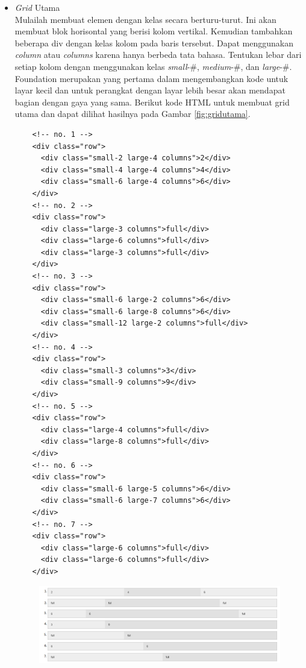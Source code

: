\begin{enumerate}[(1)]
\begin{itemize}
  \item {\it Grid} Utama\\
  Mulailah membuat elemen dengan kelas secara berturu-turut. Ini akan membuat
  blok horisontal yang berisi kolom vertikal. Kemudian tambahkan beberapa div
  dengan kelas kolom pada baris tersebut. Dapat menggunakan {\it column} atau
  {\it columns} karena hanya berbeda tata bahasa. Tentukan lebar dari setiap
  kolom dengan menggunakan kelas {\it small}-\#, {\it medium}-\#, dan
  {\it large}-\#.
  Foundation merupakan yang pertama dalam mengembangkan kode untuk layar kecil
  dan untuk perangkat dengan layar lebih besar akan mendapat bagian dengan gaya yang
  sama. Berikut kode HTML untuk membuat grid utama dan dapat dilihat hasilnya
  pada Gambar \ref{fig:gridutama}.
  	\begin{lstlisting}
  	<!-- no. 1 -->
  	<div class="row">
	  <div class="small-2 large-4 columns">2</div>
	  <div class="small-4 large-4 columns">4</div>
	  <div class="small-6 large-4 columns">6</div>
	</div>
	<!-- no. 2 -->
	<div class="row">
	  <div class="large-3 columns">full</div>
	  <div class="large-6 columns">full</div>
	  <div class="large-3 columns">full</div>
	</div>
	<!-- no. 3 -->
	<div class="row">
	  <div class="small-6 large-2 columns">6</div>
	  <div class="small-6 large-8 columns">6</div>
	  <div class="small-12 large-2 columns">full</div>
	</div>
	<!-- no. 4 -->
	<div class="row">
	  <div class="small-3 columns">3</div>
	  <div class="small-9 columns">9</div>
	</div>
	<!-- no. 5 -->
	<div class="row">
	  <div class="large-4 columns">full</div>
	  <div class="large-8 columns">full</div>
	</div>
	<!-- no. 6 -->
	<div class="row">
	  <div class="small-6 large-5 columns">6</div>
	  <div class="small-6 large-7 columns">6</div>
	</div>
	<!-- no. 7 -->
	<div class="row">
	  <div class="large-6 columns">full</div>
	  <div class="large-6 columns">full</div>
	</div>
  	\end{lstlisting}
  	\begin{figure}[H]
	\centering
	\includegraphics[scale=0.6]{Gambar/gridutama.png}

\end{figure}
\end{itemize}
\end{enumerate}
